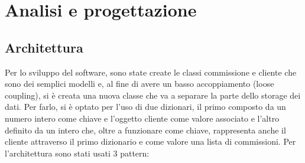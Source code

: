 \section{Analisi e progettazione}
\subsection{Architettura}

Per lo sviluppo del software, sono state create le classi commissione e cliente che sono dei semplici modelli
e, al fine di avere un basso accoppiamento (loose coupling), si è creata una nuova classe che va a 
separare la parte dello storage dei dati. 
Per farlo, si è optato per l'uso di due dizionari, il primo composto da un numero intero come chiave e l'oggetto cliente come valore associato e 
l'altro definito da un intero che, oltre a funzionare come chiave, rappresenta anche il cliente attraverso il primo dizionario e come valore una
lista di commissioni.  
 \vspace{0.5cm}
 Per l'architettura sono stati usati 3 pattern:
